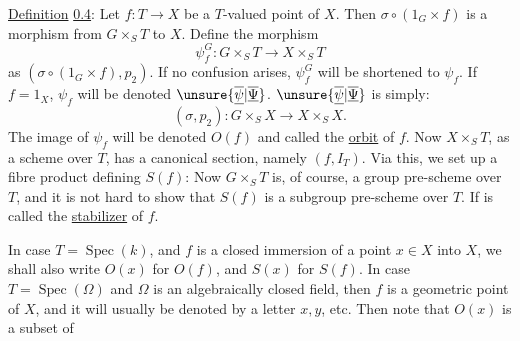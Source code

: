 
\uline{Definition} \uline{0.4}: Let $f:T\longrightarrow X$ be a $T$-valued point of $X$. Then $\sigma\circ(1_G\times f)$ is a morphism from $G\times_S T$ to $X$. Define the morphism
\[
\psi_f^G:G\times_S T\longrightarrow X\times_S T
\]
as $(\sigma\circ(1_G\times f),p_2)$. If no confusion arises, $\psi_f^G$ will be shortened to $\psi_f$. If $f=1_X$, $\psi_f$ will be denoted $\unsure{\overline{\underline{\psi}}|\overline{\underline{\Psi}}}$. $\unsure{\overline{\underline{\psi}}|\overline{\underline{\Psi}}}$ is simply:
\[
(\sigma,p_2):G\times_S X\longrightarrow X\times_S X.
\]
The image of $\psi_f$ will be denoted $O(f)$ and called the \uline{orbit} of $f$. Now $X\times_S T$, as a scheme over $T$, has a canonical section, namely $(f,I_T)$. Via this, we set up a fibre product defining $S(f)$:
Now $G\times_S T$ is, of course, a group pre-scheme over $T$, and it is not hard to show that $S(f)$ is a subgroup pre-scheme over $T$. If is called the \uline{stabilizer} of $f$.

In case $T=\operatorname{Spec}(k)$, and $f$ is a closed immersion of a point $x\in X$ into $X$, we shall also write $O(x)$ for $O(f)$, and $S(x)$ for $S(f)$. In case $T=\operatorname{Spec}(\Omega)$ and $\Omega$ is an algebraically closed field, then $f$ is a geometric point of $X$, and it will usually be denoted by a letter $x,y$, etc. Then note that $O(x)$ is a subset of

